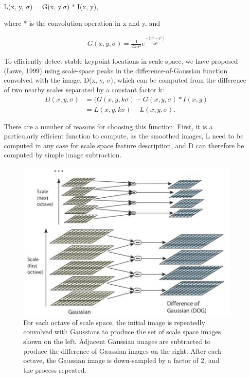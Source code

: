 L(x, y, $\sigma$) = G(x, y,$\sigma$) * I(x, y),


where * is the convolution operation in x and y, and

\begin{align*} 
 G(x, y,\sigma )  =\frac{1}{2\pi\sigma^2} e^\frac{-( x^2 -  y^2)}{2\sigma^2}  
\end{align*}

To efficiently detect stable keypoint locations in scale space, we have proposed (Lowe,
1999) using scale-space peaks in the difference-of-Gaussian function convolved with the
image, D(x, y, $\sigma$), which can be computed from the difference of two nearby scales separated
by a constant factor k:
\begin{align}
D(x, y, \sigma) &= (G(x, y, k\sigma) - G(x, y,\sigma) * I(x, y)\\
                 &= L(x, y, k\sigma) - L(x, y, \sigma) .
   \end{align}               
                  
There are a number of reasons for choosing this function. First, it is a particularly
efficient function to compute, as the smoothed images, L  need to be computed in any
case for scale space feature description, and D can therefore be computed by simple image
subtraction.

\begin{figure}[H]
\centering
\includegraphics[width=1.0\textwidth]{img/sift_dog.jpg}
\caption{ For each octave of scale space, the initial image is repeatedly convolved with Gaussians to
produce the set of scale space images shown on the left. Adjacent Gaussian images are subtracted
to produce the difference-of-Gaussian images on the right. After each octave, the Gaussian image
is down-sampled by a factor of 2, and the process repeated.}
\label{fig:sift1}
\end{figure}

